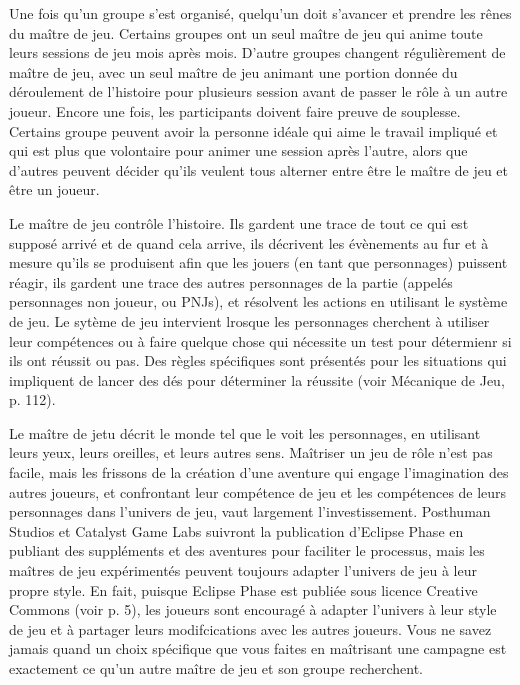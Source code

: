 Une fois qu'un groupe s'est organisé, quelqu'un doit s'avancer et prendre les rênes du maître de jeu. Certains groupes ont un seul maître de jeu qui anime toute leurs sessions de jeu mois après mois. D'autre groupes changent régulièrement de maître de jeu, avec un seul maître de jeu animant une portion donnée du déroulement de l'histoire pour plusieurs session avant de passer le rôle à un autre joueur. Encore une fois, les participants doivent faire preuve de souplesse. Certains groupe peuvent avoir la personne idéale qui aime le travail impliqué et qui est plus que volontaire pour animer une session après l'autre, alors que d'autres peuvent décider qu'ils veulent tous alterner entre être le maître de jeu et être un joueur. 

Le maître de jeu contrôle l'histoire. Ils gardent une trace de tout ce qui est supposé arrivé et de quand cela arrive, ils décrivent les évènements au fur et à mesure qu'ils se produisent afin que les jouers (en tant que personnages) puissent réagir, ils gardent une trace des autres personnages de la partie (appelés personnages non joueur, ou PNJs), et résolvent les actions en utilisant le système de jeu. Le sytème de jeu intervient lrosque les personnages cherchent à utiliser leur compétences ou à faire quelque chose qui nécessite un test pour détermienr si ils ont réussit ou pas. Des règles spécifiques sont présentés pour les situations qui impliquent de lancer des dés pour déterminer la réussite (voir Mécanique de Jeu, p.  112). 

Le maître de jetu décrit le monde tel que le voit les personnages, en utilisant leurs yeux, leurs oreilles, et leurs autres sens. Maîtriser un jeu de rôle n'est pas facile, mais les frissons de la création d'une aventure qui engage l'imagination des autres joueurs, et confrontant leur compétence de jeu et les compétences de leurs personnages dans l'univers de jeu, vaut largement l'investissement. Posthuman Studios et Catalyst Game Labs suivront la publication d'Eclipse Phase en publiant des suppléments et des aventures pour faciliter le processus, mais les maîtres de jeu expérimentés peuvent toujours adapter l'univers de jeu à leur propre style. En fait, puisque Eclipse Phase est publiée sous licence Creative Commons (voir p. 5), les joueurs sont encouragé à adapter l'univers à leur style de jeu et à partager leurs modifcications avec les autres joueurs. Vous ne savez jamais quand un choix spécifique que vous faites en maîtrisant une campagne est exactement ce qu'un autre maître de jeu et son groupe recherchent. 

